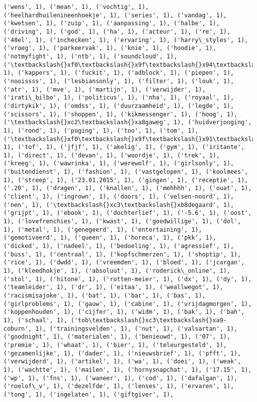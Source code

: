 \documentclass{article}
\begin{document}
\begin{Verbatim}[commandchars=\\\{\}]
('wens', 1), ('mean', 1), ('vochtig', 1), ('heelhardhuilenineenhoekje', 1), ('series', 1), ('vandag', 1), ('kwetsen', 1), ('zuip', 1), ('aanpassing', 1), ('halbe', 1), ('driving', 1), ('god', 1), ('ha', 1), ('acteur', 1), ('re', 1), ('48el', 1), ('inchecken', 1), ('ervaring', 1), ('harry\_styles', 1), ('vroeg', 1), ('parkeervak', 1), ('knie', 1), ('hoodie', 1), ('notmyfight', 1), ('ntb', 1), ('soundcloud', 1), ('\textbackslash{}xf0\textbackslash{}x9f\textbackslash{}x94\textbackslash{}xa5\textbackslash{}xf0\textbackslash{}x9f\textbackslash{}x94\textbackslash{}xa5\textbackslash{}xf0\textbackslash{}x9f\textbackslash{}x92\textbackslash{}x80heavy', 1), ('kappers', 1), ('fuckit', 1), ('adblock', 1), ('piepen', 1), ('nooissss', 1), ('lesbiansonly', 1), ('filter', 1), ('louk', 1), ('atr', 1), ('mve', 1), ('martijn', 1), ('verwijder', 1), ('irati\_bilbo', 1), ('politicus', 1), ('nha', 1), ('royaal', 1), ('dirtykik', 1), ('omdss', 1), ('duurzaamheid', 1), ('legde', 1), ('scissors', 1), ('shoppen', 1), ('kikmessenger', 1), ('hoog', 1), ('\textbackslash{}xc2\textbackslash{}xa8gaweg', 1), ('huidverjonging', 1), ('rond', 1), ('poging', 1), ('too', 1), ('tom', 1), ('\textbackslash{}xf0\textbackslash{}x9f\textbackslash{}x91\textbackslash{}x8b', 1), ('tof', 1), ('jfjf', 1), ('akelig', 1), ('gym', 1), ('iritante', 1), ('direct', 1), ('devan', 1), ('woordje', 1), ('trek', 1), ('kreeg', 1), ('wawrinka', 1), ('werewolf', 1), ('girlsonly', 1), ('buitendienst', 1), ('fashion', 1), ('vastgelopen', 1), ('koolmees', 1), ('streep', 1), ('23.01.2015', 1), ('gingen', 1), ('receptie', 1), ('.20', 1), ('dragen', 1), ('knallen', 1), ('mehhhh', 1), ('ouat', 1), ('client', 1), ('ingrown', 1), ('doors', 1), ('velsen-noord', 1), ('nen', 1), ('\textbackslash{}xc3\textbackslash{}xb8degaard', 1), ('grijpt', 1), ('ebook', 1), ('dochterlief', 1), ('-5.6', 1), ('oost', 1), ('lovefrenchies', 1), ('kwast', 1), ('goedwillige', 1), ('dol', 1), ('metal', 1), ('genegeerd', 1), ('entertaining', 1), ('gemotiveerd', 1), ('queen', 1), ('horeca', 1), ('pkk', 1), ('dicked', 1), ('nadeel', 1), ('bedoeling', 1), ('agressief', 1), ('buss', 1), ('centraal', 1), ('kopfschmerzen', 1), ('shoptip', 1), ('rice', 1), ('dwdd', 1), ('vreemden', 1), ('bloed', 1), ('jcargan', 1), ('kleedhokje', 1), ('absoluut', 1), ('roderick\_online', 1), ('stol', 1), ('hitone', 1), ('rotten-meier', 1), ('dx', 1), ('dy', 1), ('teamleider', 1), ('dr', 1), ('eitaa', 1), ('weallwegot', 1), ('racismisajoke', 1), ('bat', 1), ('bar', 1), ('bas', 1), ('girlproblems', 1), ('gauw', 1), ('cabine', 1), ('vrijdagmorgen', 1), ('koppenhouden', 1), ('cijfer', 1), ('widm', 1), ('bak', 1), ('bah', 1), ('schaal', 1), ('tob\textbackslash{}xc3\textbackslash{}xa9-coburn', 1), ('trainingsvelden', 1), ('nut', 1), ('valsartan', 1), ('goodnight', 1), ('materialen', 1), ('benieuwd', 1), ('07', 1), ('premie', 1), ('whaat', 1), ('bier', 1), ('teleurgesteld', 1), ('gezamenlijke', 1), ('dader', 1), ('nieuwsbrief', 1), ('pfft', 1), ('verwijderd', 1), ('artikel', 1), ('wa', 1), ('doei', 1), ('weak', 1), ('wachtte', 1), ('mailen', 1), ('hornysnapchat', 1), ('17.15', 1), ('wp', 1), ('fns', 1), ('waneer', 1), ('cod', 1), ('dafalgan', 1), ('roelof\_v', 1), ('dezelfde', 1), ('lenses', 1), ('ervaren', 1), ('tong', 1), ('ingelaten', 1), ('giftgiver', 1), 
\end{Verbatim}
\end{document}
